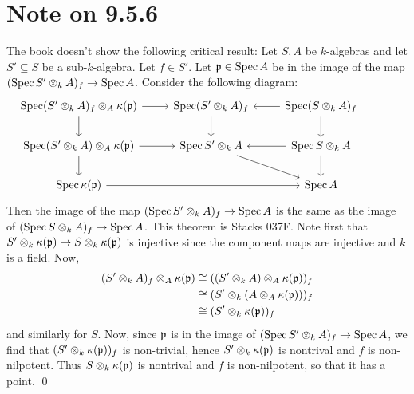 \documentclass{article}
\begin{document}
\section{Note on 9.5.6}
The book doesn't show the following critical result: Let $S, A$
be $k$-algebras and let $S' \subseteq S$ be a
sub-$k$-algebra. Let $f \in S'$. Let
$\mathfrak{p} \in \operatorname{Spec} A$ be in the image of the map $(\operatorname{Spec} S' \otimes_k A)_f \to \operatorname{Spec} A$.
Consider the following diagram: \[\begin{tikzcd}
        {\operatorname{Spec} (S' \otimes_k A)_f\otimes_A\kappa(\mathfrak{p})}                       & {\operatorname{Spec} (S' \otimes_k A)_f} &
        {\operatorname{Spec} (S \otimes_kA)_f}                                                      &
        {}
        \\{\operatorname{Spec} (S' \otimes_k A)\otimes_A\kappa(\mathfrak{p})} & {\operatorname{Spec} S'\otimes_kA}       &
        {\operatorname{Spec} S\otimes_kA}
        \\{\operatorname{Spec} \kappa(\mathfrak{p})}                          &                                          &
        {\operatorname{Spec} A}
        \arrow[from=2-2, to=3-3]
        \arrow[from=2-3, to=3-3]
        \arrow[from=2-3, to=2-2]
        \arrow[from=1-2, to=2-2]
        \arrow[from=1-3, to=2-3]
        \arrow[from=1-3, to=1-2]
        \arrow[from=3-1, to=3-3]
        \arrow[from=1-1, to=1-2]
        \arrow[from=1-1, to=2-1]
        \arrow[from=2-1, to=2-2]
        \arrow[from=2-1, to=3-1]
    \end{tikzcd}\] Then the image of the
map $(\operatorname{Spec} S' \otimes_k A)_f \to \operatorname{Spec} A$ is the same as the image of $(\operatorname{Spec} S \otimes_k A)_f \to \operatorname{Spec} A$.
This theorem is Stacks 037F. Note first that $S' \otimes_k \kappa(\mathfrak{p}) \to S \otimes_k \kappa(\mathfrak{p})$ is
injective since the component maps are injective and $k$ is
a field. Now,
\begin{align*}
    (S' \otimes_k A)_f \otimes_A \kappa(\mathfrak{p}) & \cong ((S' \otimes_k A) \otimes_A \kappa(\mathfrak{p}))_f \\
                                            & \cong (S' \otimes_k (A \otimes_A \kappa(\mathfrak{p})))_f \\
                                            & \cong (S' \otimes_k \kappa(\mathfrak{p}))_f
\end{align*}
and similarly for $S$. Now, since $\mathfrak{p}$ is
in the image of $(\operatorname{Spec} S' \otimes_k A)_f \to \operatorname{Spec} A$, we find that $(S' \otimes_k \kappa(\mathfrak{p}))_f$ is
non-trivial, hence $S' \otimes_k \kappa(\mathfrak{p})$ is nontrival and
$f$ is non-nilpotent. Thus $S \otimes_k \kappa(\mathfrak{p})$ is
nontrival and $f$ is non-nilpotent, so that it has a point.
\qed
\end{document}
